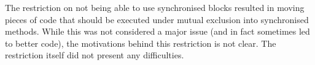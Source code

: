 The restriction on not being able to use synchronised blocks resulted in moving pieces of code that should be executed under mutual exclusion into synchronised methods. While this was not considered a major issue (and in fact sometimes led to better code), the motivations behind this restriction is not clear. The restriction itself did not present any difficulties.